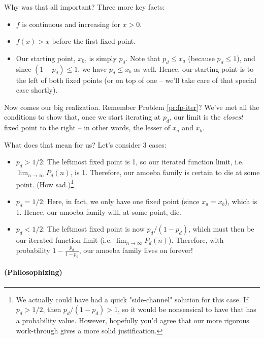 Why was that all important? Three more key facts:

\begin{itemize}
\item $f$ is continuous and increasing for $x > 0$. 
\item $f(x) > x$ before the first fixed point. 
\item Our starting point, $x_0$, is simply $p_d$. Note that $p_d \leq x_a$ (because $p_d \leq 1$), and since $(1 - p_d) \leq 1$, we have $p_d \leq x_b$ as well. Hence, our starting point is to the left of both fixed points (or on top of one -- we'll take care of that special case shortly). 
\end{itemize}

Now comes our big realization. Remember Problem \ref{pr:fp-iter}? We've met all the conditions to show that, once we start iterating at $p_d$, our limit is the \emph{closest} fixed point to the right -- in other words, the lesser of $x_a$ and $x_b$.

What does that mean for us? Let's consider 3 cases:

\begin{itemize}
\item $p_d > 1/2$: The leftmost fixed point is 1, so our iterated function limit, i.e. $\lim_{n \rightarrow \infty} P_d(n)$, is 1. Therefore, our amoeba family is certain to die at some point. (How sad.)\footnote{We actually could have had a quick "side-channel" solution for this case. If $p_d > 1/2$, then $p_d / (1 - p_d) > 1$, so it would be nonsensical to have that has a probability value. However, hopefully you'd agree that our more rigorous work-through gives a more solid justification.}
\item $p_d = 1/2$: Here, in fact, we only have one fixed point (since $x_a = x_b$), which is 1. Hence, our amoeba family will, at some point, die.
\item $p_d < 1/2$: The leftmost fixed point is now $p_d / (1 - p_d)$, which must then be our iterated function limit (i.e. $\lim_{n \rightarrow \infty} P_d(n)$). Therefore, with probability $1 - \frac{p_d}{1-p_d}$, our amoeba family lives on forever!
\end{itemize}


\paragraph{(Philosophizing)}



